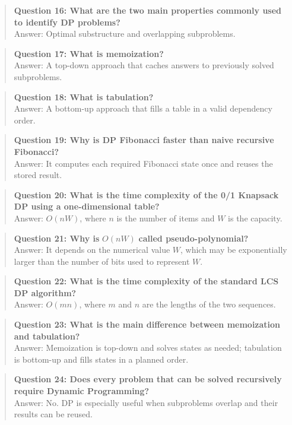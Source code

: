 \begin{quote}
\textbf{Question 16: What are the two main properties commonly used to identify DP problems?}\\[4pt]
Answer: Optimal substructure and overlapping subproblems.
\end{quote}
\begin{quote}
\textbf{Question 17: What is memoization?}\\[4pt]
Answer: A top-down approach that caches answers to previously solved subproblems.
\end{quote}
\begin{quote}
\textbf{Question 18: What is tabulation?}\\[4pt]
Answer: A bottom-up approach that fills a table in a valid dependency order.
\end{quote}
\begin{quote}
\textbf{Question 19: Why is DP Fibonacci faster than naive recursive Fibonacci?}\\[4pt]
Answer: It computes each required Fibonacci state once and reuses the stored result.
\end{quote}
\begin{quote}
\textbf{Question 20: What is the time complexity of the 0/1 Knapsack DP using a one-dimensional table?}\\[4pt]
Answer: $O(nW)$, where $n$ is the number of items and $W$ is the capacity.
\end{quote}
\begin{quote}
\textbf{Question 21: Why is }$O(nW)$\textbf{ called pseudo-polynomial?}\\[4pt]
Answer: It depends on the numerical value $W$, which may be exponentially larger than the number of bits used to represent $W$.
\end{quote}
\begin{quote}
\textbf{Question 22: What is the time complexity of the standard LCS DP algorithm?}\\[4pt]
Answer: $O(mn)$, where $m$ and $n$ are the lengths of the two sequences.
\end{quote}
\begin{quote}
\textbf{Question 23: What is the main difference between memoization and tabulation?}\\[4pt]
Answer: Memoization is top-down and solves states as needed; tabulation is bottom-up and fills states in a planned order.
\end{quote}
\begin{quote}
\textbf{Question 24: Does every problem that can be solved recursively require Dynamic Programming?}\\[4pt]
Answer: No. DP is especially useful when subproblems overlap and their results can be reused.
\end{quote}
